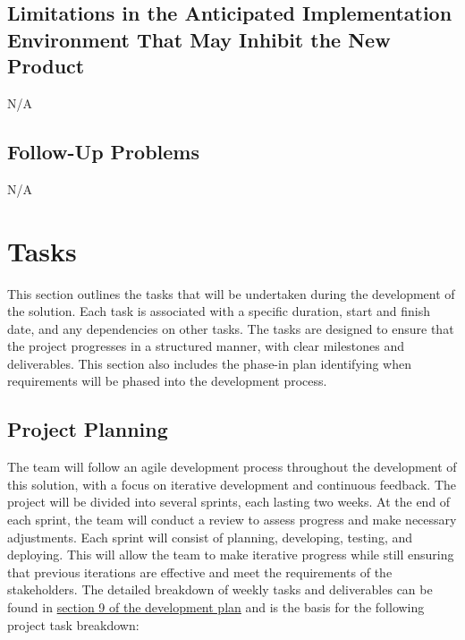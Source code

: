 \documentclass[12pt]{article}
\begin{document}
\subsection{Limitations in the Anticipated Implementation Environment That May
Inhibit the New Product}
\noindent N/A

\subsection{Follow-Up Problems}
\noindent N/A

\section{Tasks}

This section outlines the tasks that will be undertaken during the development of the solution. Each task is associated with a specific duration, start and finish date, and any dependencies on other tasks. The tasks are designed to ensure that the project progresses in a structured manner, with clear milestones and deliverables. This section also includes the phase-in plan identifying when requirements will be phased into the development process.

\subsection{Project Planning}

The team will follow an agile development process throughout the development of this solution, with a focus on iterative development and continuous feedback. The project will be divided into several sprints, each lasting two weeks. At the end of each sprint, the team will conduct a review to assess progress and make necessary adjustments. Each sprint will consist of planning, developing, testing, and deploying. This will allow the team to make iterative progress while still ensuring that previous iterations are effective and meet the requirements of the stakeholders.
The detailed breakdown of weekly tasks and deliverables can be found in \href{https://github.com/arjunkarthik123/fitness-finance-application/blob/main/pdfs/DevelopmentPlan/DevelopmentPlan.pdf}{section 9 of the development plan} and is the basis for the following project task breakdown:
\end{document}
